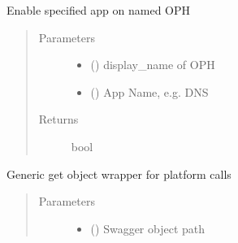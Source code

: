 \documentclass[letterpaper,10pt,english]{sphinxmanual}
\begin{document}
\begin{fulllineitems}

\begin{fulllineitems}
\label{\detokenize{b1oph-class:bloxone.b1oph.enable_app}}
\sphinxAtStartPar
Enable specified app on named OPH
\begin{quote}\begin{description}
\item[{Parameters}] \leavevmode\begin{itemize}
\item {} 
\sphinxAtStartPar
{} () \textendash{} display\_name of OPH

\item {} 
\sphinxAtStartPar
{} () \textendash{} App Name, e.g. DNS

\end{itemize}

\item[{Returns}] \leavevmode
\sphinxAtStartPar
bool

\end{description}\end{quote}

\end{fulllineitems}


\begin{fulllineitems}
\label{\detokenize{b1oph-class:bloxone.b1oph.get}}
\sphinxAtStartPar
Generic get object wrapper for platform calls
\begin{quote}\begin{description}
\item[{Parameters}] \leavevmode\begin{itemize}
\item {} 
\sphinxAtStartPar
{} () \textendash{} Swagger object path


\end{itemize}
\end{description}
\end{quote}
\end{fulllineitems}
\end{fulllineitems}
\end{document}
